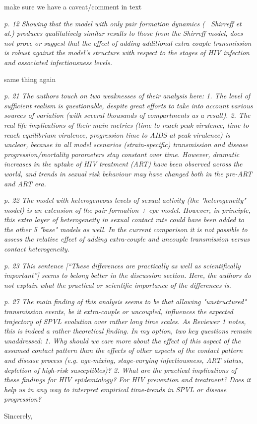 \documentclass[10pt]{letter}
\newcommand{\revcomment}[1]{\emph{#1}}
\newcommand{\response}[1]{#1}
\begin{document}
\begin{letter}{
}
\response{make sure we have a caveat/comment in text}

\revcomment{
p. 12 Showing that the model with only pair formation dynamics (~
Shirreff et al.) produces qualitatively similar results to those from
the Shirreff model, does not prove or suggest that the effect of
adding additional extra-couple transmission is robust against the
model's structure with respect to the stages of HIV infection and
associated infectiousness levels.
}

\response{same thing again}

\revcomment{
p. 21 The authors touch on two weaknesses of their analysis here: 1. The level of sufficient realism is questionable, despite great efforts to take into account various sources of variation (with several thousands of compartments as a result).
2. The real-life implications of their main metrics (time to reach
peak virulence, time to reach equilibrium virulence, progression time
to AIDS at peak virulence) is unclear, because in all model scenarios
(strain-specific) transmission and disease progression/mortality
parameters stay constant over time. However, dramatic increases in the
uptake of HIV treatment (ART) have been observed across the world, and
trends in sexual risk behaviour may have changed both in the pre-ART
and ART era.
}

\revcomment{
p. 22  The model with heterogeneous levels of sexual activity (the
"heterogeneity" model) is an extension of the pair formation + epc
model. However, in principle, this extra layer of heterogeneity in
sexual contact rate could have been added to the other 5 "base" models
as well. In the current comparison it is not possible to assess the
relative effect of adding extra-couple and uncouple transmission
versus contact heterogeneity.
}

\revcomment{
p. 23 
This sentence [``These differences are practically as well as
scientifically important''] seems to belong better in the discussion section. Here, the authors do not explain what the practical or scientific importance of the differences is.
}


\revcomment{
p. 27 The main finding of this analysis seems to be that allowing "unstructured" transmission events, be it extra-couple or uncoupled, influences the expected trajectory of SPVL evolution over rather long time scales. As Reviewer 1 notes, this is indeed a rather theoretical finding. In my option, two key questions remain unaddressed: 1. Why should we care more about the effect of this aspect of the assumed contact pattern than the effects of other aspects of the contact pattern and disease process (e.g. age-mixing, stage-varying infectiousness, ART status, depletion of high-risk susceptibles)?
2. What are the practical implications of these findings for HIV
epidemiology? For HIV prevention and treatment? Does it help us in any
way to interpret empirical time-trends in SPVL or disease progression?
}

\closing{Sincerely,}

%

\end{letter}
\end{document}
